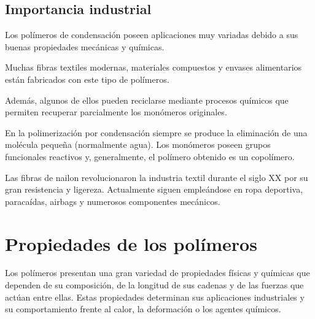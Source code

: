 
\subsection{Importancia industrial}

Los polímeros de condensación poseen aplicaciones muy variadas debido a sus buenas
propiedades mecánicas y químicas.

Muchas fibras textiles modernas, materiales compuestos y envases alimentarios están
fabricados con este tipo de polímeros.

Además, algunos de ellos pueden reciclarse mediante procesos químicos que permiten
recuperar parcialmente los monómeros originales.


\begin{tcolorbox}[
title=Recuerda,
colback=blue!5,
colframe=blue!70!black]

En la polimerización por condensación siempre se produce la eliminación de una
molécula pequeña (normalmente agua). Los monómeros poseen grupos funcionales
reactivos y, generalmente, el polímero obtenido es un copolímero.

\end{tcolorbox}


\begin{tcolorbox}[
title=Curiosidad,
colback=green!5,
colframe=green!60!black]

Las fibras de nailon revolucionaron la industria textil durante el siglo XX por su
gran resistencia y ligereza. Actualmente siguen empleándose en ropa deportiva,
paracaídas, airbags y numerosos componentes mecánicos.

\end{tcolorbox}


\section{Propiedades de los polímeros}

Los polímeros presentan una gran variedad de propiedades físicas y químicas que
dependen de su composición, de la longitud de sus cadenas y de las fuerzas que
actúan entre ellas. Estas propiedades determinan sus aplicaciones industriales y
su comportamiento frente al calor, la deformación o los agentes químicos.

